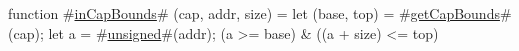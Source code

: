function #\hyperref[sailRISCVzinCapBounds]{inCapBounds}# (cap, addr, size) = {
  let (base, top) = #\hyperref[sailRISCVzgetCapBounds]{getCapBounds}#(cap);
  let a = #\hyperref[sailRISCVzunsigned]{unsigned}#(addr);
  (a >= base) & ((a + size) <= top)
}
